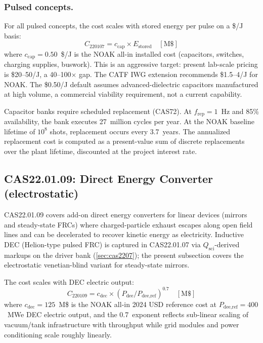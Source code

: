 \documentclass{article}
\begin{document}
\subsubsection{Pulsed concepts.}
For all pulsed concepts, the cost scales with stored energy per
pulse on a \$/J basis:
\begin{equation}
  C_{220107} = c_{\text{cap}} \times E_{\text{stored}} \quad [\text{M\$}]
\end{equation}
where $c_{\text{cap}} = 0.50$~\$/J is the NOAK all-in installed cost
(capacitors, switches, charging supplies, buswork).  This is an
aggressive target: present lab-scale pricing is \$20--50/J, a 40--100$\times$
gap.  The CATF IWG extension \citep{woodruff2026b} recommends
\$1.5--4/J for NOAK.  The \$0.50/J default assumes advanced-dielectric
capacitors manufactured at high volume, a commercial viability
requirement, not a current capability.

Capacitor banks require scheduled replacement (CAS72).  At $f_{\text{rep}}
= 1$~Hz and 85\% availability, the bank executes 27~million cycles per
year.  At the NOAK baseline lifetime of $10^8$ shots, replacement occurs
every 3.7~years.  The annualized replacement cost is computed as a
present-value sum of discrete replacements over the plant lifetime,
discounted at the project interest rate.

\subsection{CAS22.01.09: Direct Energy Converter (electrostatic)}
\label{sec:cas2209}

CAS22.01.09 covers add-on direct energy converters for linear devices
(mirrors and steady-state FRCs) where charged-particle exhaust escapes
along open field lines and can be decelerated to recover kinetic energy
as electricity.  Inductive DEC (Helion-type pulsed FRC) is captured in
CAS22.01.07 via $Q_{\text{sci}}$-derived markups on the driver bank
(\cref{sec:cas2207}); the present subsection covers the electrostatic
venetian-blind variant for steady-state mirrors.

The cost scales with DEC electric output:
\begin{equation}
  C_{220109} = c_{\text{dec}} \times (P_{\text{dee}} / P_{\text{dee,ref}})^{0.7}
  \quad [\text{M\$}]
\end{equation}
where $c_{\text{dec}} = 125$~M\$ is the NOAK all-in 2024 USD reference
cost at $P_{\text{dee,ref}} = 400$~MWe DEC electric output, and the
0.7~exponent reflects sub-linear scaling of vacuum/tank infrastructure
with throughput while grid modules and power conditioning scale roughly
linearly.
\end{document}
